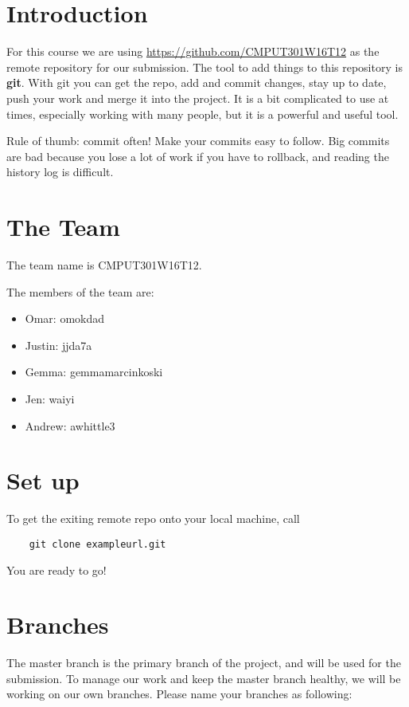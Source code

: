 \documentclass[14pt]{report}
\begin{document}
	\section{Introduction}
	
	For this course we are using \url{https://github.com/CMPUT301W16T12} as the remote repository for our submission.
	The tool to add things to this repository is \textbf{git}.
	With git you can get the repo, add and commit changes, stay up to date, push your work and merge it into the project.
	It is a bit complicated to use at times, especially working with many people, but it is a powerful and useful tool.
	
	Rule of thumb: commit often!
	Make your commits easy to follow.
	Big commits are bad because you lose a lot of work if you have to rollback, and reading the history log is difficult.
	
	\section{The Team}
	
	The team name is CMPUT301W16T12.
	
	The members of the team are:
	\begin{itemize}
		\item
		Omar: omokdad
		\item
		Justin: jjda7a
		\item
		Gemma: gemmamarcinkoski
		\item
		Jen: waiyi
		\item
		Andrew: awhittle3
	\end{itemize}
	
	\section{Set up}
	To get the exiting remote repo onto your local machine, call
	\begin{verbatim}
	git clone exampleurl.git
	\end{verbatim}
	
	You are ready to go!
	
	\section{Branches}
	
	The master branch is the primary branch of the project, and will be used for the submission.
	To manage our work and keep the master branch healthy, we will be working on our own branches.
	Please name your branches as following:
	
\end{document}
